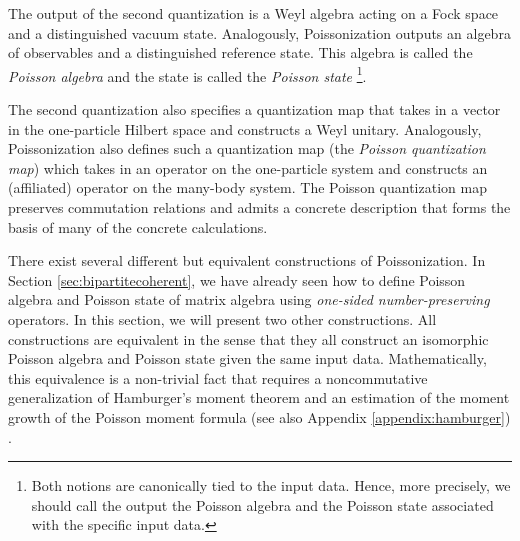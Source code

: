 \documentclass[a4paper,11pt]{article}
\theoremstyle{definition}
\numberwithin{equation}{section}
\begin{document}
The output of the second quantization is a Weyl algebra acting on a Fock space and a distinguished vacuum state. Analogously, Poissonization outputs an algebra of observables and a distinguished reference state. This algebra is called the \textit{Poisson algebra} and the state is called the \textit{Poisson state} \footnote{Both notions are canonically tied to the input data. Hence, more precisely, we should call the output the Poisson algebra and the Poisson state associated with the specific input data.}.

The second quantization also specifies a quantization map that takes in a vector in the one-particle Hilbert space and constructs a Weyl unitary. Analogously, Poissonization also defines such a quantization map (the \textit{Poisson quantization map}) which takes in an operator on the one-particle system and constructs an (affiliated\cite{T}) operator on the many-body system. The Poisson quantization map preserves commutation relations and admits a concrete description that forms the basis of many of the concrete calculations.

There exist several different but equivalent constructions of Poissonization. In Section \ref{sec:bipartitecoherent}, we have already seen how to define Poisson algebra and Poisson state of matrix algebra using \textit{one-sided number-preserving} operators. In this section, we will present two other constructions. All constructions are equivalent in the sense that they all construct an isomorphic Poisson algebra and Poisson state given the same input data. Mathematically, this equivalence is a non-trivial fact that requires a noncommutative generalization of Hamburger's moment theorem and an estimation of the moment growth of the Poisson moment formula (see also Appendix \ref{appendix:hamburger}) \cite{MAW}. 
\end{document}
